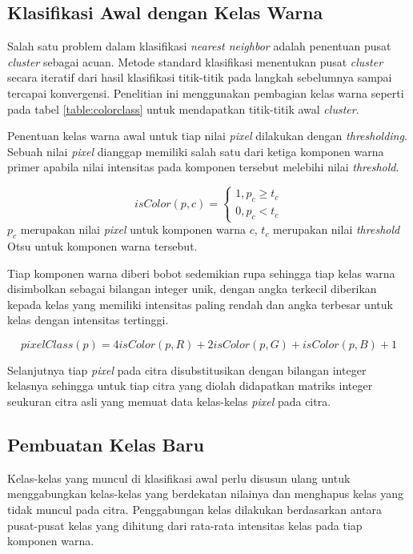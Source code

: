 \documentclass[laporan.tex]{subfiles}
\begin{document}
\subsection{Klasifikasi Awal dengan Kelas Warna}
Salah satu problem dalam klasifikasi \emph{nearest neighbor} adalah penentuan pusat \emph{cluster} sebagai acuan. Metode standard klasifikasi menentukan pusat \emph{cluster} secara iteratif dari hasil klasifikasi titik-titik pada langkah sebelumnya sampai tercapai konvergensi. Penelitian ini menggunakan pembagian kelas warna seperti pada tabel \ref{table:colorclass} untuk mendapatkan titik-titik awal \emph{cluster}.

Penentuan kelas warna awal untuk tiap nilai \emph{pixel} dilakukan dengan \emph{thresholding}. Sebuah nilai \emph{pixel} dianggap memiliki salah satu dari ketiga komponen warna primer apabila nilai intensitas pada komponen tersebut melebihi nilai \emph{threshold}.

\begin{equation}
	isColor(p,c) = \begin{cases}
			1, p_c \geq t_c \\
			0, p_c < t_c
		\end{cases}
\end{equation}
$p_c$ merupakan nilai \emph{pixel} untuk komponen warna $c$, $t_c$ merupakan nilai \emph{threshold} Otsu untuk komponen warna tersebut.

Tiap komponen warna diberi bobot sedemikian rupa sehingga tiap kelas warna disimbolkan sebagai bilangan integer unik, dengan angka terkecil diberikan kepada kelas yang memiliki intensitas paling rendah dan angka terbesar untuk kelas dengan intensitas tertinggi.

\begin{equation}
	pixelClass(p) = 4 isColor(p,R) + 2 isColor(p,G) + isColor(p,B) + 1
\end{equation}

Selanjutnya tiap \emph{pixel} pada citra disubstitusikan dengan bilangan integer kelasnya sehingga untuk tiap citra yang diolah didapatkan matriks integer seukuran citra asli yang memuat data kelas-kelas \emph{pixel} pada citra.

\subsection{Pembuatan Kelas Baru}

Kelas-kelas yang muncul di klasifikasi awal perlu disusun ulang untuk menggabungkan kelas-kelas yang berdekatan nilainya dan menghapus kelas yang tidak muncul pada citra. Penggabungan kelas dilakukan berdasarkan antara pusat-pusat kelas yang dihitung dari rata-rata intensitas kelas pada tiap komponen warna.
\end{document}
